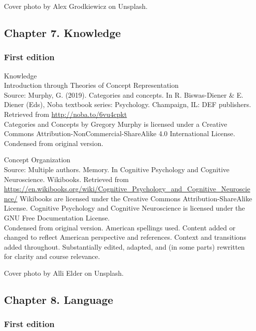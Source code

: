 \documentclass[
]{krantz}
\begin{document}
Cover photo by Alex Grodkiewicz on Unsplash.

\hypertarget{chapter-7.-knowledge}{%
\subsection*{Chapter 7. Knowledge}\label{chapter-7.-knowledge}}


\hypertarget{first-edition-7}{%
\subsubsection*{First edition}\label{first-edition-7}}


Knowledge\\
Introduction through Theories of Concept Representation\\
Source: Murphy, G. (2019). Categories and concepts. In R. Biswas-Diener \& E. Diener (Eds), Noba textbook series: Psychology. Champaign, IL: DEF publishers. Retrieved from \url{http://noba.to/6vu4cpkt}\\
Categories and Concepts by Gregory Murphy is licensed under a Creative Commons Attribution-NonCommercial-ShareAlike 4.0 International License.\\
Condensed from original version.

Concept Organization\\
Source: Multiple authors. Memory. In Cognitive Psychology and Cognitive Neuroscience. Wikibooks. Retrieved from \url{https://en.wikibooks.org/wiki/Cognitive_Psychology_and_Cognitive_Neuroscience/}
Wikibooks are licensed under the Creative Commons Attribution-ShareAlike License.
Cognitive Psychology and Cognitive Neuroscience is licensed under the GNU Free Documentation License.\\
Condensed from original version. American spellings used. Content added or changed to reflect American perspective and references. Context and transitions added throughout. Substantially edited, adapted, and (in some parts) rewritten for clarity and course relevance.

Cover photo by Alli Elder on Unsplash.

\hypertarget{chapter-8.-language}{%
\subsection*{Chapter 8. Language}\label{chapter-8.-language}}


\hypertarget{first-edition-8}{%
\subsubsection*{First edition}\label{first-edition-8}}
\end{document}
